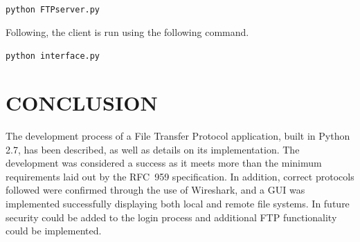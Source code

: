\documentclass[10pt,twocolumn]{witseiepaper}
\begin{document}
\texttt{python FTPserver.py}

Following, the client is run using the following command.

\texttt{python interface.py}


\section{CONCLUSION}
The development process of a File Transfer Protocol application, built in Python 2.7, has been described, as well as details on its implementation. The development was considered a success as it meets more than the minimum requirements laid out by the RFC~959 specification. In addition, correct protocols followed were confirmed through the use of Wireshark, and a GUI was implemented successfully displaying both local and remote file systems. In future security could be added to the login process and additional FTP functionality could be implemented.

%



\newpage
\onecolumn
\end{document}
